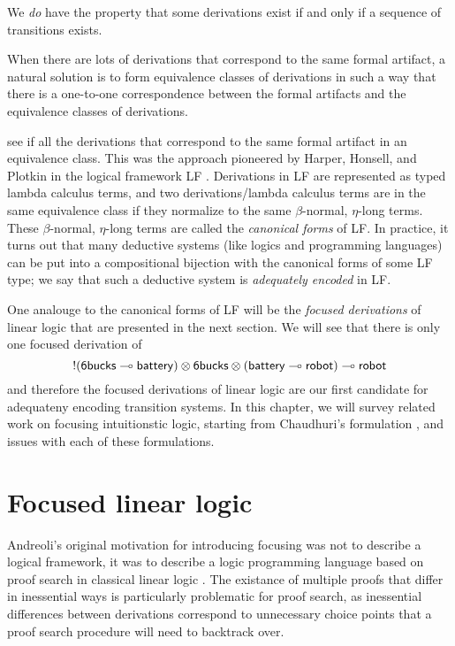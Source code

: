 We {\it do} have the property that some derivations exist if and only if
a sequence of transitions exists. 

When there are lots of derivations that correspond to the same formal
artifact, a natural solution is to form equivalence classes of derivations
in such a way that there is a one-to-one correspondence between 
the formal artifacts and the equivalence classes of derivations.

see if all the derivations that
correspond to the same formal artifact in an equivalence class.  This
was the approach pioneered by Harper, Honsell, and Plotkin in the
logical framework LF \cite{harper93framework}. Derivations in LF are
represented as typed lambda calculus terms, and two derivations/lambda
calculus terms are in the same equivalence class if they normalize to
the same $\beta$-normal, $\eta$-long terms. These $\beta$-normal,
$\eta$-long terms are called the {\it canonical forms} of LF. In
practice, it turns out that many deductive systems (like logics and
programming languages) can be put into a compositional bijection with
the canonical forms of some LF type; we say that such a deductive
system is {\it adequately encoded} in LF.

One analouge to the canonical forms of LF will be the {\it focused
  derivations} of linear logic that are presented in the next
section. We will see that there is only
one focused derivation of 
\[{!}({\sf 6bucks} \multimap {\sf battery}) \otimes {\sf 6bucks} \otimes
({\sf battery} \multimap {\sf robot}) \multimap {\sf robot}\] and therefore
the focused derivations of linear logic are our first candidate for
adequateny encoding transition systems. In this chapter, we will
survey related work on focusing intuitionstic logic, starting from
Chaudhuri's formulation \cite{chaudhuri06focused}, and issues with
each of these formulations.

\section{Focused linear logic}

Andreoli's original motivation for introducing focusing was not to
describe a logical framework, it was to describe a logic programming
language based on proof search in classical linear logic
\cite{andreoli92logic}. The existance of multiple proofs that differ
in inessential ways is particularly problematic for proof search, as
inessential differences between derivations correspond to unnecessary
choice points that a proof search procedure will need to backtrack
over. 

